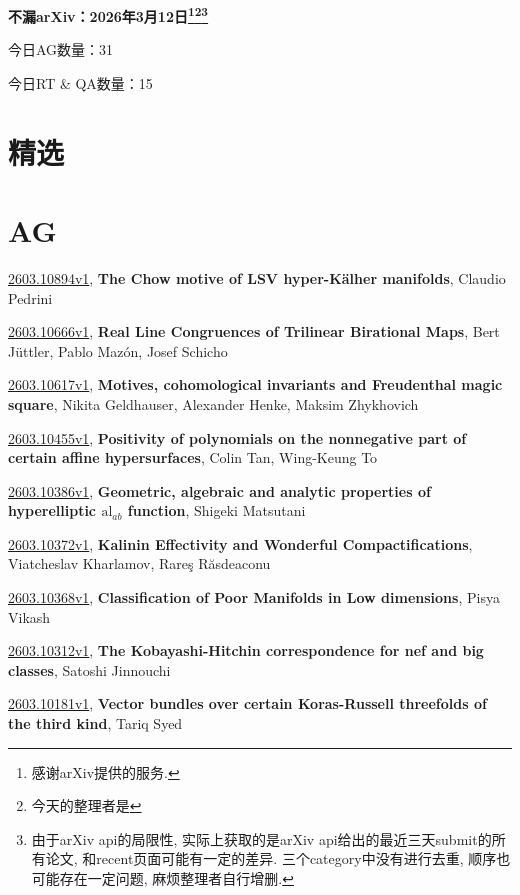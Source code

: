 \documentclass[9pt, a4paper]{article}
\theoremstyle{plain}
\theoremstyle{definition}
\theoremstyle{remark}
\newcommand{\arxiv}[3]{\href{https://arxiv.org/abs/#1}{#1}, \textbf{\textcolor{arxivblue}{#2}}, #3}
\newcommand{\AGnumber}{31}
\newcommand{\RTQAnumber}{15}
\newcommand{\NewestDate}{2026年3月12日}
\newcommand{\todayarXiver}{} %
\begin{document}
\begin{center}
    \Huge\textbf{不漏arXiv：\NewestDate\footnote{感谢arXiv提供的服务.}\footnote{今天的整理者是\todayarXiver}\footnote{由于arXiv api的局限性, 实际上获取的是arXiv api给出的最近三天submit的所有论文, 和recent页面可能有一定的差异. 三个category中没有进行去重, 顺序也可能存在一定问题, 麻烦整理者自行增删.}} \\
\end{center}

\setcounter{section}{-1}

\begin{center}
    今日AG数量：\AGnumber
    
    今日RT \& QA数量：\RTQAnumber
    
\end{center}


\section{精选}


\section{AG}
\arxiv{2603.10894v1}{The Chow motive of LSV hyper-Kälher manifolds}{Claudio Pedrini}

\arxiv{2603.10666v1}{Real Line Congruences of Trilinear Birational Maps}{Bert Jüttler, Pablo Mazón, Josef Schicho}

\arxiv{2603.10617v1}{Motives, cohomological invariants and Freudenthal magic square}{Nikita Geldhauser, Alexander Henke, Maksim Zhykhovich}

\arxiv{2603.10455v1}{Positivity of polynomials on the nonnegative part of certain affine hypersurfaces}{Colin Tan, Wing-Keung To}

\arxiv{2603.10386v1}{Geometric, algebraic and analytic properties of hyperelliptic $\mathrm{al}_{ab}$ function}{Shigeki Matsutani}

\arxiv{2603.10372v1}{Kalinin Effectivity and Wonderful Compactifications}{Viatcheslav Kharlamov, Rareş Răsdeaconu}

\arxiv{2603.10368v1}{Classification of Poor Manifolds in Low dimensions}{Pisya Vikash}

\arxiv{2603.10312v1}{The Kobayashi-Hitchin correspondence for nef and big classes}{Satoshi Jinnouchi}

\arxiv{2603.10181v1}{Vector bundles over certain Koras-Russell threefolds of the third kind}{Tariq Syed}
\end{document}
